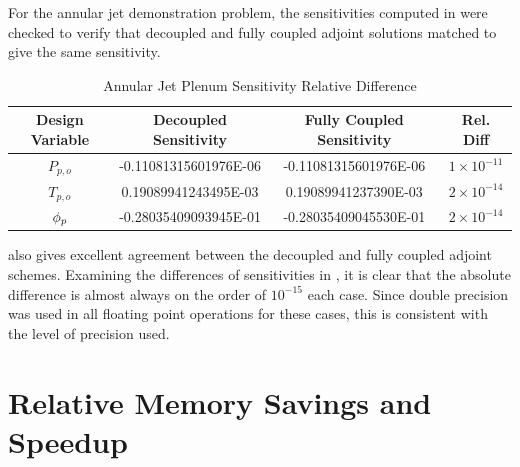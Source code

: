 For the annular jet demonstration problem, the sensitivities computed in
 were checked to verify that decoupled and fully
coupled adjoint solutions matched to give the same sensitivity.
\begin{table}[h]
  \centering
  \begin{tabular}{c|c|c|c}
    Design Variable & Decoupled Sensitivity & Fully Coupled Sensitivity & Rel. Diff\\
    \hline
    $P_{p,o}$ & -0.11081315601976E-06 & -0.11081315601976E-06 & $1 \times 10^{-11}$ \\
    $T_{p,o}$ &  0.19089941243495E-03 &  0.19089941237390E-03 & $2 \times 10^{-14}$ \\
    $\phi_p$     & -0.28035409093945E-01 & -0.28035409045530E-01 & $2 \times 10^{-14}$
  \end{tabular}
  \caption{Annular Jet Plenum Sensitivity Relative Difference}
  \label{tab:srp-adj-diff}
\end{table}
 also gives excellent agreement between the decoupled and
fully coupled adjoint schemes.  Examining the differences of sensitivities in
, it is clear
that the absolute difference is almost always on the order of $10^{-15}$ each
case.  Since double precision was used in all floating point operations for
these cases, this is consistent with the level of precision used.

\section{Relative Memory Savings and Speedup}
\label{sec:adj-cost-mem-savings}

